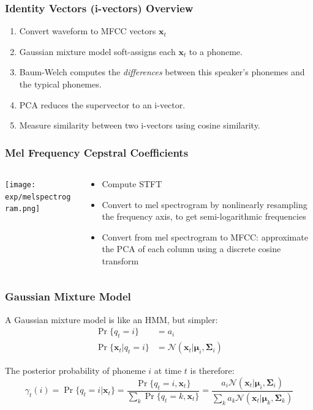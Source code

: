 \documentclass{beamer}
\begin{document}
\begin{frame}
  \frametitle{Identity Vectors (i-vectors) Overview}

  \begin{enumerate}
  \item Convert waveform to MFCC vectors $\bm{x}_t$
  \item Gaussian mixture model soft-assigns each $\bm{x}_t$ to a phoneme.
  \item Baum-Welch computes the {\em differences} between this
    speaker's phonemes and the typical phonemes.
  \item PCA reduces the supervector to an i-vector.
  \item Measure similarity between two i-vectors using cosine similarity.
  \end{enumerate}
\end{frame}

\begin{frame}
  \frametitle{Mel Frequency Cepstral Coefficients}
  \begin{columns}
    \begin{column}{0.5\textwidth}
      \centerline{\texttt{[image: exp/melspectrogram.png]}}
    \end{column}
    \begin{column}{0.5\textwidth}
      \begin{itemize}
      \item Compute STFT
      \item Convert to mel spectrogram by nonlinearly resampling the
        frequency axis, to get semi-logarithmic frequencies
      \item Convert from mel spectrogram to MFCC: approximate the PCA
        of each column using a discrete cosine transform
      \end{itemize}
    \end{column}
  \end{columns}
\end{frame}

\begin{frame}
  \frametitle{Gaussian Mixture Model}

  A Gaussian mixture model is like an HMM, but simpler:
  \begin{align*}
    \Pr\{q_t=i\} &= a_i\\
    \Pr\{\bm{x}_t|q_t=i\} &= \mathcal{N}\left(\bm{x}_t|\bm{\mu}_i,\bm{\Sigma}_i\right)
  \end{align*}

  The posterior probability of phoneme $i$ at time $t$ is therefore:
  \begin{displaymath}
    \gamma_t(i)=\Pr\{q_t=i|\bm{x}_t\}
    =\frac{\Pr\{q_t=i,\bm{x}_t\}}{\sum_k\Pr\{q_t=k,\bm{x}_t\}}
    =\frac{a_i\mathcal{N}(\bm{x}_t|\bm{\mu}_i,\bm{\Sigma}_i)}{\sum_ka_k\mathcal{N}(\bm{x}_t|\bm{\mu}_k,\bm{\Sigma}_k)}
  \end{displaymath}
\end{frame}
\end{document}
